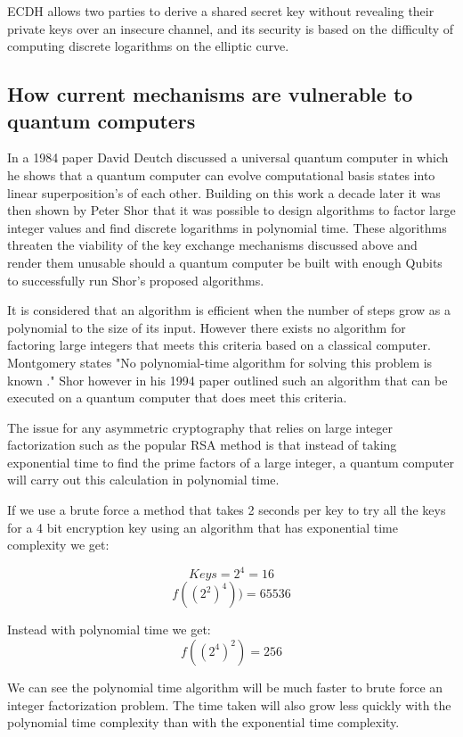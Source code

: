 \documentclass{article}
\begin{document}
ECDH allows two parties to derive a shared secret key without revealing their private keys over an insecure channel, and its security is based on the difficulty of computing discrete logarithms on the elliptic curve.

\subsection{How current mechanisms are vulnerable to quantum computers}
In a 1984 paper David Deutch \cite{Deutsch1985QuantumComputer} discussed a universal quantum computer in which he shows that a quantum computer can evolve computational basis states into linear superposition's of each other. Building on this work a decade later it was then shown by Peter Shor \cite{Shor1994AlgorithmsFactoring} that it was possible to design algorithms to factor large integer values and find discrete logarithms in polynomial time. These algorithms threaten the viability of the key exchange mechanisms discussed above and render them unusable should a quantum computer be built with enough Qubits to successfully run Shor's proposed algorithms.

It is considered that an algorithm is efficient when the number of steps grow as a polynomial to the size of its input. \cite{Shor1994AlgorithmsFactoring}  However there exists no algorithm for factoring large integers that meets this criteria based on a classical computer. Montgomery \cite{Montgomery1994AAlgorithms} states "No polynomial-time algorithm for solving this problem is known ."  Shor however in his 1994 paper  outlined  \cite{Shor1994AlgorithmsFactoring} such an algorithm that can be executed on a quantum computer that does meet this criteria. 

The issue for any asymmetric cryptography that relies on large integer factorization such as the popular RSA method is that instead of taking exponential time to find the prime factors of a large integer, a quantum computer will carry out this calculation in polynomial time. 

If we use a brute force a method that takes 2 seconds per key to try all the keys for a 4 bit encryption key using an algorithm that has exponential time complexity we get:

\[Keys = 2^4 = 16\]
\[f((2^2)^4)) = 65536\]


Instead with polynomial time we get:
\[f((2^4)^2) = 256\]

We can see the polynomial time algorithm will be much faster to brute force an integer factorization problem. The time taken will also grow less quickly with the polynomial time complexity than with the exponential time complexity.
\end{document}
